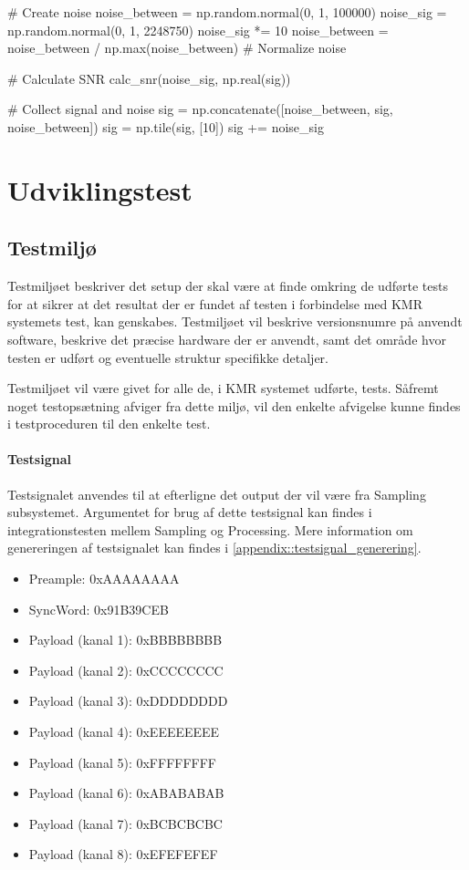\begin{appendices}
\begin{python}
	# Create noise
	noise_between = np.random.normal(0, 1, 100000)
	noise_sig = np.random.normal(0, 1, 2248750)
	noise_sig *= 10
	noise_between = noise_between / np.max(noise_between)  # Normalize noise
	
	# Calculate SNR
	calc_snr(noise_sig, np.real(sig))
	
	# Collect signal and noise
	sig = np.concatenate([noise_between, sig, noise_between])
	sig = np.tile(sig, [10])
	sig += noise_sig
\end{python}

\pagebreak

\chapter{Udviklingstest} \label{appendix::test}

\section{Testmiljø} 
Testmiljøet beskriver det setup der skal være at finde omkring de udførte tests for at sikrer at det resultat der er fundet af testen i forbindelse med KMR systemets test, kan genskabes. Testmiljøet vil beskrive versionsnumre på anvendt software, beskrive det præcise hardware der er anvendt, samt det område hvor testen er udført og eventuelle struktur specifikke detaljer.

Testmiljøet vil være givet for alle de, i KMR systemet udførte, tests. Såfremt noget testopsætning afviger fra dette miljø, vil den enkelte afvigelse kunne findes i testproceduren til den enkelte test.

\subsubsection{Testsignal}
Testsignalet anvendes til at efterligne det output der vil være fra Sampling subsystemet. Argumentet for brug af dette testsignal kan findes i integrationstesten mellem Sampling og Processing. Mere information om genereringen af testsignalet kan findes i \ref{appendix::testsignal_generering}.

\begin{itemize}
	\item Preample: 0xAAAAAAAA
	\item SyncWord: 0x91B39CEB
	\item Payload (kanal 1): 0xBBBBBBBB
	\item Payload (kanal 2): 0xCCCCCCCC
	\item Payload (kanal 3): 0xDDDDDDDD
	\item Payload (kanal 4): 0xEEEEEEEE
	\item Payload (kanal 5): 0xFFFFFFFF
	\item Payload (kanal 6): 0xABABABAB
	\item Payload (kanal 7): 0xBCBCBCBC
	\item Payload (kanal 8): 0xEFEFEFEF
\end{itemize} 


\end{appendices}
